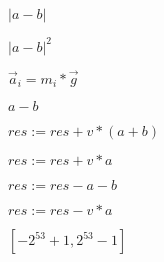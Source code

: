 \documentclass{article}
\begin{document}
$|a-b|$
\pagebreak

$|a-b|^2$
\pagebreak

$\vec a_i = m_i * \vec g $
\pagebreak

$a-b$
\pagebreak

$ res := res + v*(a+b)$
\pagebreak

$ res := res + v*a$
\pagebreak

$ res := res - a - b$
\pagebreak

$ res := res - v*a$
\pagebreak

$[-2^{53}+1, 2^{53}-1]$
\pagebreak
\end{document}
